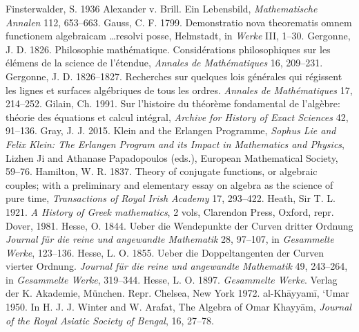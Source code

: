 \newline\indent Finsterwalder, S. 1936 Alexander v. Brill. Ein Lebensbild, \emph{Mathematische Annalen} 112, 653--663.
\newline\indent Gauss, C. F.  1799. Demonstratio nova theorematis omnem functionem algebraicam \ldots resolvi posse, Helmstadt, in \emph{Werke} III, 1--30.
\newline\indent Gergonne, J. D. 1826. Philosophie math\'ematique. Consid\'erations philo\-sophiques sur les \'el\'emens de la science de l'\'etendue, \emph{Annales de Math\'ematiques} 16, 209--231.
\newline\indent Gergonne, J. D. 1826--1827. Recherches sur quelques lois g\'en\'erales qui r\'egissent les lignes et surfaces alg\'ebriques de tous les ordres. \emph{Annales de Math\'ematiques} 17, 214--252. 
 \newline\indent  Gilain, Ch. 1991. Sur l'histoire du th\'eor\`eme  fondamental de l'alg\`ebre: th\'eorie des \'equations et calcul int\'egral, \emph{Archive for History of Exact Sciences} 42, 91--136. 
\newline\indent  Gray, J. J. 2015. Klein and the Erlangen Programme, \emph{Sophus Lie and Felix Klein: The Erlangen Program and its Impact in Mathematics and Physics}, Lizhen Ji and Athanase Papadopoulos (eds.), European Mathematical Society, 59--76.
 \newline\indent Hamilton, W. R.  1837. Theory of conjugate functions, or algebraic couples; with a preliminary and elementary essay on algebra as the science of pure time, \emph{Transactions of Royal Irish Academy}  17, 293--422. 
 \newline\indent Heath, Sir T. L. 1921. \emph{A History of Greek mathematics}, 2 vols, Clarendon Press, Oxford, repr. Dover, 1981.
 \newline\indent Hesse, O. 1844. Ueber die Wendepunkte der  Curven dritter Ordnung \emph{Journal f{\"u}r die reine und angewandte Mathematik} 28, 97--107, in \emph{Gesammelte Werke}, 123--136.
\newline\indent  Hesse, L. O. 1855. Ueber die Doppeltangenten der Curven vierter Ordnung. \emph{Journal f{\"u}r die reine und angewandte Mathematik} 49, 243--264, in \emph{Gesammelte Werke}, 319--344.
\newline\indent Hesse, L. O. 1897. \emph{Gesammelte Werke}. Verlag der K.  Akademie, M\"{u}nchen. Repr. Chelsea, New York 1972.
\newline\indent al-Kh\={a}yyam\={i}, `Umar 1950. In H. J. J. Winter and W. Arafat, The Algebra of Omar Khayy\={a}m, \emph{Journal of the Royal Asiatic Society of Bengal}, 16, 27--78.
